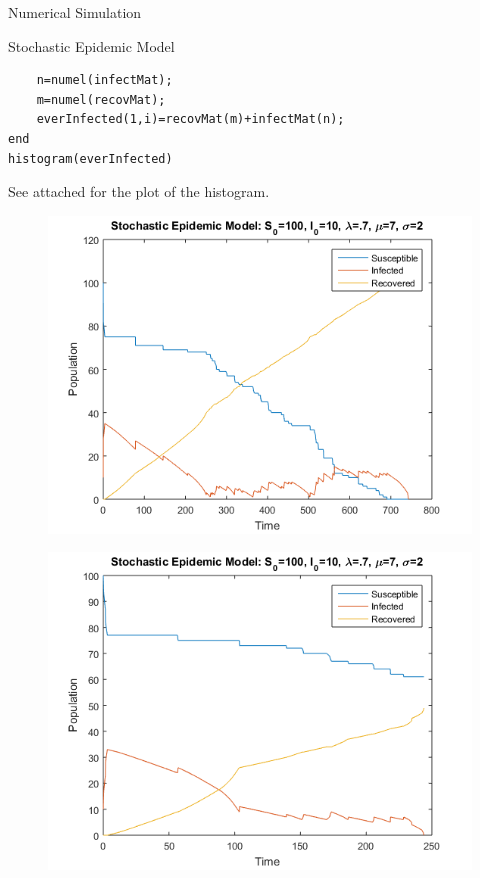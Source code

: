 \documentclass[12pt]{article}
\numberwithin{equation}{section}
\begin{document}
\begin{section}{Numerical Simulation}
\begin{subsection}{Stochastic Epidemic Model}
\begin{lstlisting}
    n=numel(infectMat);
    m=numel(recovMat);
    everInfected(1,i)=recovMat(m)+infectMat(n);
end
histogram(everInfected)
\end{lstlisting}
See attached for the plot of the histogram.
\end{subsection}
\begin{figure}
\centering
\includegraphics[width=400pt]{SIRModelEndemic}
\end{figure}
\begin{figure}
\centering
\includegraphics[width=400pt]{SIRModelLife}
\end{figure}
\end{section}
\end{document}
